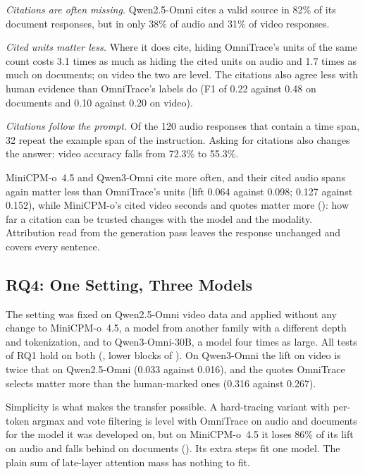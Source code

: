 \emph{Citations are often missing.} Qwen2.5-Omni cites a valid source in 82\% of its document responses, but in only 38\% of audio and 31\% of video responses.

\emph{Cited units matter less.} Where it does cite, hiding OmniTrace's units of the same count costs 3.1 times as much as hiding the cited units on audio and 1.7 times as much on documents; on video the two are level.
The citations also agree less with human evidence than OmniTrace's labels do (F1 of 0.22 against 0.48 on documents and 0.10 against 0.20 on video).

\emph{Citations follow the prompt.} Of the 120 audio responses that contain a time span, 32 repeat the example span of the instruction.
Asking for citations also changes the answer: video accuracy falls from 72.3\% to 55.3\%.

MiniCPM-o~4.5 and Qwen3-Omni cite more often, and their cited audio spans again matter less than OmniTrace's units (lift 0.064 against 0.098; 0.127 against 0.152), while MiniCPM-o's cited video seconds and quotes matter more (): how far a citation can be trusted changes with the model and the modality.
Attribution read from the generation pass leaves the response unchanged and covers every sentence.

\subsection{RQ4: One Setting, Three Models}
\label{sec:variants}

The setting was fixed on Qwen2.5-Omni video data and applied without any change to MiniCPM-o~4.5, a model from another family with a different depth and tokenization, and to Qwen3-Omni-30B, a model four times as large.
All tests of RQ1 hold on both (, lower blocks of ).
On Qwen3-Omni the lift on video is twice that on Qwen2.5-Omni (0.033 against 0.016), and the quotes OmniTrace selects matter more than the human-marked ones (0.316 against 0.267).

Simplicity is what makes the transfer possible.
A hard-tracing variant with per-token argmax and vote filtering is level with OmniTrace on audio and documents for the model it was developed on, but on MiniCPM-o~4.5 it loses 86\% of its lift on audio and falls behind on documents ().
Its extra steps fit one model. The plain sum of late-layer attention mass has nothing to fit.
